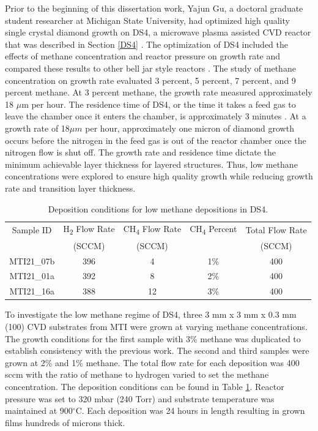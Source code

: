 Prior to the beginning of this dissertation work, Yajun Gu, a doctoral graduate student researcher at Michigan State University, had optimized high quality single crystal diamond growth on DS4, a microwave plasma assisted CVD reactor that was described in Section \ref{DS4} \cite{Gu2011THESYNTHESIS}. The optimization of DS4 included the effects of methane concentration and reactor pressure on growth rate and compared these results to other bell jar style reactors \cite{Gu2012}. The study of methane concentration on growth rate evaluated 3 percent, 5 percent, 7 percent, and 9 percent methane. At 3 percent methane, the growth rate measured approximately 18 $\mu$m per hour. The residence time of DS4, or the time it takes a feed gas to leave the chamber once it enters the chamber, is approximately 3 minutes \cite{Gu2011THESYNTHESIS}. At a growth rate of 18$\mu m$ per hour, approximately one micron of diamond growth occurs before the nitrogen in the feed gas is out of the reactor chamber once the nitrogen flow is shut off. The growth rate and residence time dictate the minimum achievable layer thickness for layered structures. Thus, low methane concentrations were explored to ensure high quality growth while reducing growth rate and transition layer thickness.

\begin{table}
    \centering
    \begin{tabular}{c|cccc}
        Sample ID & H\textsubscript{2} Flow Rate & CH\textsubscript{4} Flow Rate & CH\textsubscript{4} Percent & Total Flow Rate \\
        & (SCCM) & (SCCM)  &  & (SCCM)\\
        \hline
         MTI21\_07b & 396 & 4 & 1\% & 400\\
         MTI21\_01a & 392 & 8 & 2\% & 400\\
         MTI21\_16a & 388 & 12 & 3\% & 400\\
    \end{tabular}
    \caption{Deposition conditions for low methane depositions in DS4.}
    \label{tab:LowCH4DepoSummary}
\end{table}

To investigate the low methane regime of DS4, three 3 mm x 3 mm x 0.3 mm (100) CVD substrates from MTI were grown at varying methane concentrations. The growth conditions for the first sample with 3\% methane was duplicated to establish consistency with the previous work. The second and third samples were grown at 2\% and 1\% methane. The total flow rate for each deposition was 400 sccm with the ratio of methane to hydrogen varied to set the methane concentration. The deposition conditions can be found in Table \ref{tab:LowCH4DepoSummary}. Reactor pressure was set to 320 mbar (240 Torr) and substrate temperature was maintained at 900$^\circ$C. Each deposition was 24 hours in length resulting in grown films hundreds of microns thick.

